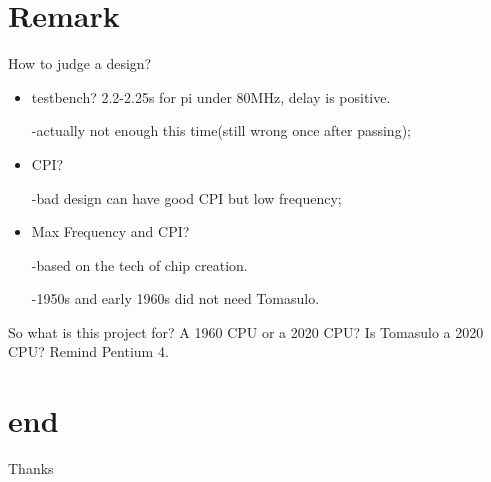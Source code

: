 \documentclass{beamer}
\begin{document}
\section{Remark}
\begin{frame}{How to judge a design?}
    \begin{itemize}
        \item testbench? 2.2-2.25s for pi under 80MHz, delay is positive. 
        
        -actually not enough this time(still wrong once after passing);
        \item CPI? 
        
        -bad design can have good CPI but low frequency;

        \item Max Frequency and CPI? 
        
        -based on the tech of chip creation. 

        -1950s and early 1960s did not need Tomasulo. 
    \end{itemize}
    So what is this project for? A 1960 CPU or a 2020 CPU? Is Tomasulo a 2020 CPU? Remind Pentium 4. 
\end{frame}

\section{end}
\begin{frame}
\Huge{\centerline{Thanks}}
\end{frame}
\end{document}
